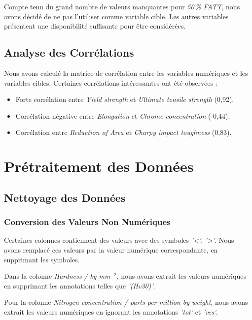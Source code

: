 \documentclass{article}
\begin{document}
Compte tenu du grand nombre de valeurs manquantes pour \textit{50\,\% FATT}, nous avons décidé de ne pas l'utiliser comme variable cible. Les autres variables présentent une disponibilité suffisante pour être considérées.

\subsection{Analyse des Corrélations}

Nous avons calculé la matrice de corrélation entre les variables numériques et les variables cibles. Certaines corrélations intéressantes ont été observées :

\begin{itemize}
    \item Forte corrélation entre \textit{Yield strength} et \textit{Ultimate tensile strength} (0,92).
    \item Corrélation négative entre \textit{Elongation} et \textit{Chrome concentration} (-0,44).
    \item Corrélation entre \textit{Reduction of Area} et \textit{Charpy impact toughness} (0,83).
\end{itemize}

\section{Prétraitement des Données}

\subsection{Nettoyage des Données}

\subsubsection{Conversion des Valeurs Non Numériques}

Certaines colonnes contiennent des valeurs avec des symboles \textit{'<'}, \textit{'>'}. Nous avons remplacé ces valeurs par la valeur numérique correspondante, en supprimant les symboles.

Dans la colonne \textit{Hardness / kg mm$^{-2}$}, nous avons extrait les valeurs numériques en supprimant les annotations telles que \textit{'(Hv30)'}.

Pour la colonne \textit{Nitrogen concentration / parts per million by weight}, nous avons extrait les valeurs numériques en ignorant les annotations \textit{'tot'} et \textit{'res'}.
\end{document}
